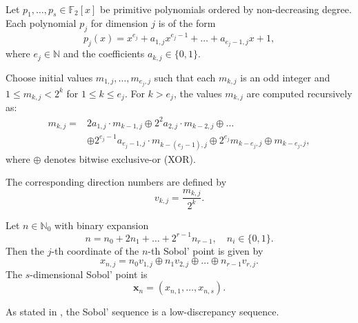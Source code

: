 \begin{definition} \ \\
\label{def:sobol}
Let $p_1, \dots, p_s \in \mathbb{F}_2[x]$ be primitive polynomials ordered by
non-decreasing degree. Each polynomial $p_j$ for dimension $j$ is of the form
\begin{equation*}
    p_j(x) = x^{e_j} + a_{1,j}x^{e_j - 1} + \dots + a_{e_j - 1,j}x + 1,
\end{equation*}
where $e_j \in \mathbb{N}$ and the coefficients $a_{k,j} \in \{0,1\}$.

Choose initial values $m_{1,j}, \dots, m_{e_j,j}$ such that each $m_{k,j}$ is an
odd integer and $1 \leq m_{k,j} < 2^k$ for $1 \leq k \leq e_j$. For $k > e_j$,
the values $m_{k,j}$ are computed recursively as:
\begin{align*}
    m_{k,j} =& 2 a_{1,j} \cdot m_{k-1,j} \oplus 2^2 a_{2,j} \cdot m_{k-2,j} \oplus \dots \\
    &\oplus 2^{e_j-1} a_{e_j-1,j} \cdot m_{k-(e_j-1),j} \oplus 2^{e_j} m_{k-e_j,j} \oplus m_{k-e_j,j},
\end{align*}
where $\oplus$ denotes bitwise exclusive-or (XOR).

The corresponding direction numbers are defined by
\begin{equation*}
    v_{k,j} = \frac{m_{k,j}}{2^k}.
\end{equation*}

Let $n \in \mathbb{N}_0$ with binary expansion
\begin{equation*}
    n = n_0 + 2n_1 + \dots + 2^{r-1}n_{r-1}, \quad n_i \in \{0,1\}.
\end{equation*}
Then the $j$-th coordinate of the $n$-th Sobol' point is given by
\begin{equation*}
    x_{n,j} = n_0 v_{1,j} \oplus n_1 v_{2,j} \oplus \dots \oplus n_{r-1} v_{r,j}.
\end{equation*}
The $s$-dimensional Sobol' point is
\begin{equation*}
    \boldsymbol{x}_n = (x_{n,1}, \dots, x_{n,s}).
\end{equation*}
\end{definition}

As stated in \cite[Chapter 5]{leobacher2014introduction}, the Sobol' sequence is
a low-discrepancy sequence.

